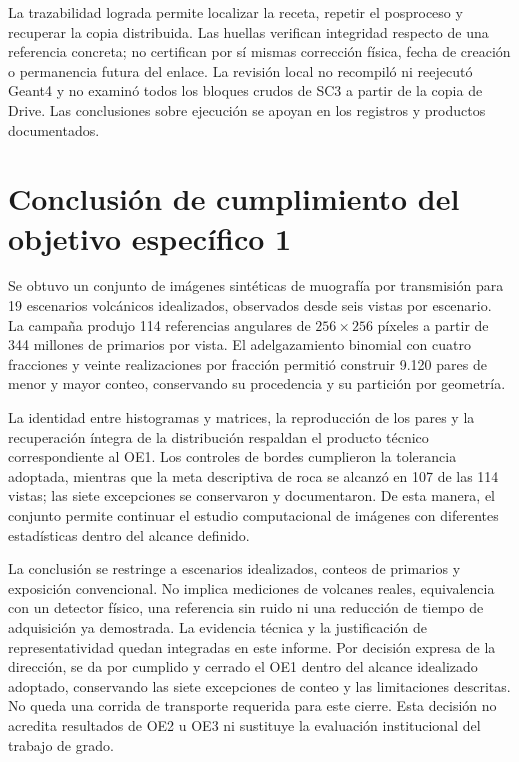\documentclass[11pt,a4paper]{article}
\begin{document}
La trazabilidad lograda permite localizar la receta, repetir el posproceso y recuperar la copia distribuida. Las huellas verifican integridad respecto de una referencia concreta; no certifican por sí mismas corrección física, fecha de creación o permanencia futura del enlace. La revisión local no recompiló ni reejecutó Geant4 y no examinó todos los bloques crudos de SC3 a partir de la copia de Drive. Las conclusiones sobre ejecución se apoyan en los registros y productos documentados.

\section{Conclusión de cumplimiento del objetivo específico 1}

Se obtuvo un conjunto de imágenes sintéticas de muografía por transmisión para 19 escenarios volcánicos idealizados, observados desde seis vistas por escenario. La campaña produjo 114 referencias angulares de $256\times256$ píxeles a partir de 344 millones de primarios por vista. El adelgazamiento binomial con cuatro fracciones y veinte realizaciones por fracción permitió construir 9.120 pares de menor y mayor conteo, conservando su procedencia y su partición por geometría.

La identidad entre histogramas y matrices, la reproducción de los pares y la recuperación íntegra de la distribución respaldan el producto técnico correspondiente al OE1. Los controles de bordes cumplieron la tolerancia adoptada, mientras que la meta descriptiva de roca se alcanzó en 107 de las 114 vistas; las siete excepciones se conservaron y documentaron. De esta manera, el conjunto permite continuar el estudio computacional de imágenes con diferentes estadísticas dentro del alcance definido.

La conclusión se restringe a escenarios idealizados, conteos de primarios y exposición convencional. No implica mediciones de volcanes reales, equivalencia con un detector físico, una referencia sin ruido ni una reducción de tiempo de adquisición ya demostrada. La evidencia técnica y la justificación de representatividad quedan integradas en este informe. Por decisión expresa de la dirección, se da por cumplido y cerrado el OE1 dentro del alcance idealizado adoptado, conservando las siete excepciones de conteo y las limitaciones descritas. No queda una corrida de transporte requerida para este cierre. Esta decisión no acredita resultados de OE2 u OE3 ni sustituye la evaluación institucional del trabajo de grado.
\end{document}

